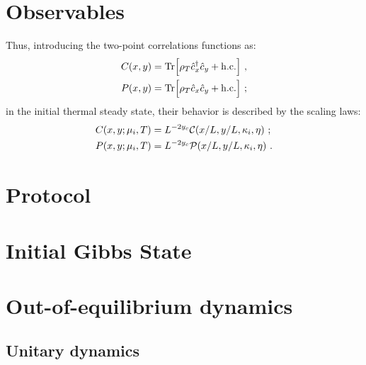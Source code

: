 \documentclass[pra,twocolumn,preprintnumbers,amsmath,amssymb,nofootinbib,floatfix,longbibliography]{revtex4}
\begin{document}
\section{Observables}

Thus, introducing the two-point correlations functions as:
\begin{align}
  \label{corrs}
  C(x,y) &={\rm Tr}\Bigr[\rho_T\hat c^\dagger_x \hat c_y
						+  {\rm h.c.}\Bigr]\,\,,\\
  P(x,y) &={\rm Tr}\Bigr[\rho_T\hat c_x\hat c_y +
    {\rm h.c.}\Bigr] \,\,;
\end{align}
in the initial thermal steady state, their behavior is
described by the scaling laws:
\begin{align}
	\label{scalTcorr}
	C(x,y;\mu_i,T) &=L^{-2y_c} {\cal C}(x/L, y/L, \kappa_i,
    \eta) \,\,;\\
	P(x,y;\mu_i,T) &=L^{-2y_c} {\cal P}(x/L, y/L, \kappa_i,
                                     \eta) \,\,.
\end{align}

\section{Protocol}

\section{Initial Gibbs State}

\section{Out-of-equilibrium dynamics}

\subsection{Unitary dynamics}
\end{document}
